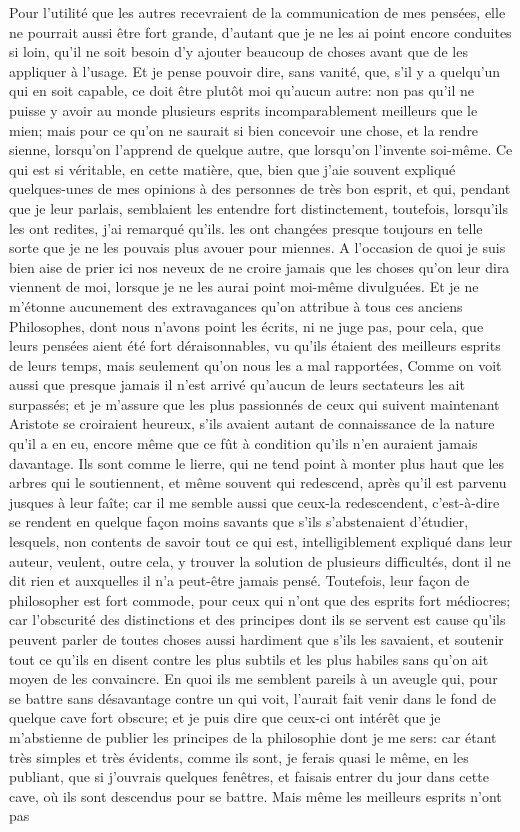 \documentclass[french,twoside]{book} %
\begin{document}
Pour l'utilité que les autres recevraient de la communication de mes pensées, elle ne pourrait aussi être fort grande, d'autant que je ne les ai point encore conduites si loin, qu'il ne soit besoin d'y ajouter beaucoup de choses avant que de les appliquer à l'usage. Et je pense pouvoir dire, sans vanité, que, s'il y a quelqu'un qui en soit capable, ce doit être plutôt moi qu'aucun autre: non pas qu'il ne puisse y avoir au monde plusieurs esprits incomparablement meilleurs que le mien; mais pour ce qu'on ne saurait si bien concevoir une chose, et la rendre sienne, lorsqu'on l'apprend de quelque autre, que lorsqu'on l'invente soi-même. Ce qui est si véritable, en cette matière, que, bien que j'aie souvent expliqué quelques-unes de mes opinions à des personnes de très bon esprit, et qui, pendant que je leur parlais, semblaient les entendre fort distinctement, toutefois, lorsqu'ils les ont redites, j'ai remarqué qu'ils. les ont changées presque toujours en telle sorte que je ne les pouvais plus avouer pour miennes. A l'occasion de quoi je suis bien aise de prier ici nos neveux de ne croire jamais que les choses qu'on leur dira viennent de moi, lorsque je ne les aurai point moi-même divulguées. Et je ne m'étonne aucunement des extravagances qu'on attribue à tous ces anciens Philosophes, dont nous n'avons point les écrits, ni ne juge pas, pour cela, que leurs pensées aient été fort déraisonnables, vu qu'ils étaient des meilleurs esprits de leurs temps, mais seulement qu'on nous les a mal rapportées, Comme on voit aussi que presque jamais il n'est arrivé qu'aucun de leurs sectateurs les ait surpassés; et je m'assure que les plus passionnés de ceux qui suivent maintenant Aristote se croiraient heureux, s'ils avaient autant de connaissance de la nature qu'il a en eu, encore même que ce fût à condition qu'ils n'en auraient jamais davantage. Ils sont comme le lierre, qui ne tend point à monter plus haut que les arbres qui le soutiennent, et même souvent qui redescend, après qu'il est parvenu jusques à leur faîte; car il me semble aussi que ceux-la redescendent, c'est-à-dire se rendent en quelque façon moins savants que s'ils s'abstenaient d'étudier, lesquels, non contents de savoir tout ce qui est, intelligiblement expliqué dans leur auteur, veulent, outre cela, y trouver la solution de plusieurs difficultés, dont il ne dit rien et auxquelles il n'a peut-être jamais pensé. Toutefois, leur façon de philosopher est fort commode, pour ceux qui n'ont que des esprits fort médiocres; car l'obscurité des distinctions et des principes dont ils se servent est cause qu'ils peuvent parler de toutes choses aussi hardiment que s'ils les savaient, et soutenir tout ce qu'ils en disent contre les plus subtils et les plus habiles sans qu'on ait moyen de les convaincre. En quoi ils me semblent pareils à un aveugle qui, pour se battre sans désavantage contre un qui voit, l'aurait fait venir dans le fond de quelque cave fort obscure; et je puis dire que ceux-ci ont intérêt que je m'abstienne de publier les principes de la philosophie dont je me sers: car étant très simples et très évidents, comme ils sont, je ferais quasi le même, en les publiant, que si j'ouvrais quelques fenêtres, et faisais entrer du jour dans cette cave, où ils sont descendus pour se battre. Mais même les meilleurs esprits n'ont pas 
\end{document}
